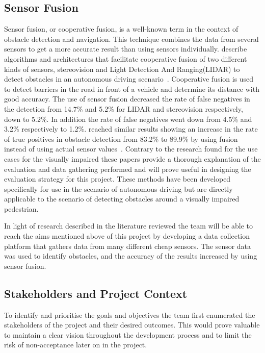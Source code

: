 \documentclass[prodmode,acmtosem]{acmsmall} %
\begin{document}
\subsection{Sensor Fusion}
Sensor fusion, or cooperative fusion, is a well-known term in the context of obstacle detection and navigation. This technique combines the data from several sensors to get a more accurate result than using sensors individually. \citet{Labayrade2005} describe algorithms and architectures that facilitate cooperative fusion of two different kinds of sensors, stereovision and Light Detection And Ranging(LIDAR) to detect obstacles in an autonomous driving scenario~\cite{Labayrade2005}. Cooperative fusion is used to detect barriers in the road in front of a vehicle and determine its distance with good accuracy. The use of sensor fusion decreased the rate of false negatives in the detection from 14.7\% and 5.2\% for LIDAR and stereovision respectively, down to 5.2\%. In addition the rate of false negatives went down from 4.5\% and 3.2\% respectively to 1.2\%. \citet{Cho2014} reached similar results showing an increase in the rate of true positives in obstacle detection from 83.2\% to 89.9\% by using fusion instead of using actual sensor values~\cite{Cho2014}. Contrary to the research found for the use cases for the visually impaired these papers provide a thorough explanation of the evaluation and data gathering performed and will prove useful in designing the evaluation strategy for this project. These methods have been developed specifically for use in the scenario of autonomous driving but are directly applicable to the scenario of detecting obstacles around a visually impaired pedestrian. 

In light of research described in the literature reviewed the team will be able to reach the aims mentioned above of this project by developing a data collection platform that gathers data from many different cheap sensors. The sensor data was used to identify obstacles, and the accuracy of the results increased by using sensor fusion.

\subsection{Stakeholders and Project Context}
To identify and prioritise the goals and objectives the team first enumerated the stakeholders of the project and their desired outcomes. This would prove valuable to maintain a clear vision throughout the development process and to limit the risk of non-acceptance later on in the project.
\end{document}
